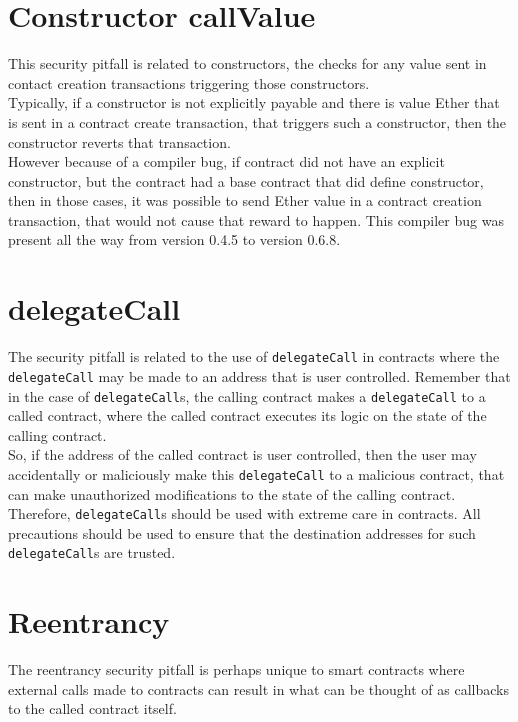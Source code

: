 \section{Constructor callValue}

This security pitfall is related to constructors, the checks for any value sent in contact creation transactions triggering those constructors. \\ 

Typically, if a constructor is not explicitly payable and there is value Ether that is sent in a contract create transaction, that triggers such a constructor, then the constructor reverts that transaction.\\ 

However because of a compiler bug, if contract did not have an explicit constructor, but the contract had a base contract that did define constructor, then in those cases, it was possible to send Ether value in a contract creation transaction, that would not cause that reward to happen. This compiler bug was present all the way from version 0.4.5 to version 0.6.8.

\section{delegateCall}

The security pitfall is related to the use of \texttt{delegateCall} in contracts where the \texttt{delegateCall} may be made to an address that is user controlled. Remember that in the case of \texttt{delegateCall}s, the calling contract makes a \texttt{delegateCall} to a called contract, where the called contract executes its logic on the state of the calling contract.\\

So, if the address of the called contract is user controlled, then the user may accidentally or maliciously make this \texttt{delegateCall} to a malicious contract, that can make unauthorized modifications to the state of the calling contract. Therefore, \texttt{delegateCall}s should be used with extreme care in contracts. All precautions should be used to ensure that the destination addresses for such \texttt{delegateCall}s are trusted.

\section{Reentrancy}

The reentrancy security pitfall is perhaps unique to smart contracts where external calls made to contracts can result in what can be thought of as callbacks to the called contract itself.\\ 

